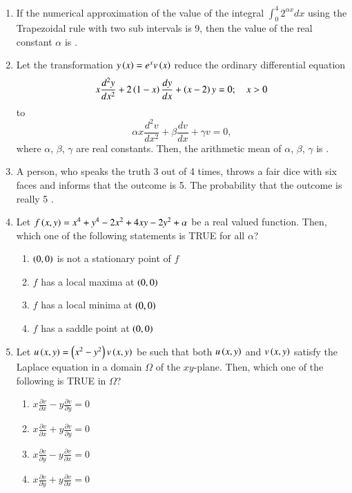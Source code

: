 \documentclass[journal]{IEEEtran}
\begin{document}
\begin{enumerate}[start=4]
\item If the numerical approximation of the value of the integral $\int_0^4 2^{\alpha x} dx$ using the Trapezoidal rule with two sub intervals is 9, then the value of the real constant $\alpha$ is \underline{\hspace{1cm}}.
\item Let the transformation $y\left(x\right) = e^x v\left(x\right)$ reduce the ordinary differential equation
$$x\frac{d^2y}{dx^2} + 2\left(1-x\right)\frac{dy}{dx} + \left(x-2\right)y = 0; \quad x > 0$$
to
$$\alpha x\frac{d^2v}{dx^2} + \beta\frac{dv}{dx} + \gamma v = 0,$$
where $\alpha$, $\beta$, $\gamma$ are real constants. Then, the arithmetic mean of $\alpha$, $\beta$, $\gamma$ is \underline{\hspace{1cm}}.
\item A person, who speaks the truth 3 out of 4 times, throws a fair dice with six faces and informs that the outcome is 5. The probability that the outcome is really 5 \underline{\hspace{1cm}}.
\item Let $f\left(x,y\right) = x^4 + y^4 - 2x^2 + 4xy - 2y^2 + \alpha$ be a real valued function. Then, which one of the following statements is TRUE for all $\alpha$?
\begin{enumerate}
    \item $\left(0,0\right)$ is not a stationary point of $f$
    \item $f$ has a local maxima at $\left(0,0\right)$
    \item $f$ has a local minima at $\left(0,0\right)$
    \item $f$ has a saddle point at $\left(0,0\right)$
\end{enumerate}
\item Let $u\left(x,y\right) = \left(x^2 - y^2\right)v\left(x,y\right)$ be such that both $u\left(x,y\right)$ and $v\left(x,y\right)$ satisfy the Laplace equation in a domain $\Omega$ of the $xy$-plane. Then, which one of the following is TRUE in $\Omega$?
\begin{enumerate}
    \item $x\frac{\partial v}{\partial x} - y\frac{\partial v}{\partial y} = 0$
    \item $x\frac{\partial v}{\partial x} + y\frac{\partial v}{\partial y} = 0$
    \item $x\frac{\partial v}{\partial y} - y\frac{\partial v}{\partial x} = 0$
    \item $x\frac{\partial v}{\partial y} + y\frac{\partial v}{\partial x} = 0$

\end{enumerate}
\end{enumerate}
\end{document}
